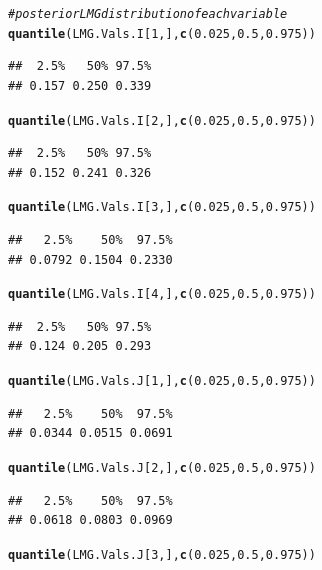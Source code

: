 \documentclass[11pt,a4paper,twoside]{book}
\makeatletter
\newcommand{\hlnum}[1]{\textcolor[rgb]{0.686,0.059,0.569}{#1}}%
\newcommand{\hlcom}[1]{\textcolor[rgb]{0.678,0.584,0.686}{\textit{#1}}}%
\newcommand{\hlstd}[1]{\textcolor[rgb]{0.345,0.345,0.345}{#1}}%
\newcommand{\hlkwd}[1]{\textcolor[rgb]{0.737,0.353,0.396}{\textbf{#1}}}%
\newenvironment{kframe}{%
 \def\at@end@of@kframe{}%
 \ifinner\ifhmode%
  \def\at@end@of@kframe{\end{minipage}}%
  \begin{minipage}{\columnwidth}%
 \fi\fi%
 \def\FrameCommand##1{\hskip\@totalleftmargin \hskip-\fboxsep
 \colorbox{shadecolor}{##1}\hskip-\fboxsep
     \hskip-\linewidth \hskip-\@totalleftmargin \hskip\columnwidth}%
 \MakeFramed {\advance\hsize-\width
   \@totalleftmargin\z@ \linewidth\hsize
   \@setminipage}}%
 {\par\unskip\endMakeFramed%
 \at@end@of@kframe}
\newenvironment{knitrout}{}{} %
\makeatother
\begin{document}
\begin{knitrout}
\begin{kframe}
\begin{alltt}
\hlcom{# posterior LMG distribution of each variable}
\hlkwd{quantile}\hlstd{(LMG.Vals.I[}\hlnum{1}\hlstd{,],} \hlkwd{c}\hlstd{(}\hlnum{0.025}\hlstd{,} \hlnum{0.5}\hlstd{,} \hlnum{0.975}\hlstd{))}
\end{alltt}
\begin{verbatim}
##  2.5%   50% 97.5% 
## 0.157 0.250 0.339
\end{verbatim}
\begin{alltt}
\hlkwd{quantile}\hlstd{(LMG.Vals.I[}\hlnum{2}\hlstd{,],} \hlkwd{c}\hlstd{(}\hlnum{0.025}\hlstd{,} \hlnum{0.5}\hlstd{,} \hlnum{0.975}\hlstd{))}
\end{alltt}
\begin{verbatim}
##  2.5%   50% 97.5% 
## 0.152 0.241 0.326
\end{verbatim}
\begin{alltt}
\hlkwd{quantile}\hlstd{(LMG.Vals.I[}\hlnum{3}\hlstd{,],} \hlkwd{c}\hlstd{(}\hlnum{0.025}\hlstd{,} \hlnum{0.5}\hlstd{,} \hlnum{0.975}\hlstd{))}
\end{alltt}
\begin{verbatim}
##   2.5%    50%  97.5% 
## 0.0792 0.1504 0.2330
\end{verbatim}
\begin{alltt}
\hlkwd{quantile}\hlstd{(LMG.Vals.I[}\hlnum{4}\hlstd{,],} \hlkwd{c}\hlstd{(}\hlnum{0.025}\hlstd{,} \hlnum{0.5}\hlstd{,} \hlnum{0.975}\hlstd{))}
\end{alltt}
\begin{verbatim}
##  2.5%   50% 97.5% 
## 0.124 0.205 0.293
\end{verbatim}
\begin{alltt}
\hlkwd{quantile}\hlstd{(LMG.Vals.J[}\hlnum{1}\hlstd{,],} \hlkwd{c}\hlstd{(}\hlnum{0.025}\hlstd{,} \hlnum{0.5}\hlstd{,} \hlnum{0.975}\hlstd{))}
\end{alltt}
\begin{verbatim}
##   2.5%    50%  97.5% 
## 0.0344 0.0515 0.0691
\end{verbatim}
\begin{alltt}
\hlkwd{quantile}\hlstd{(LMG.Vals.J[}\hlnum{2}\hlstd{,],} \hlkwd{c}\hlstd{(}\hlnum{0.025}\hlstd{,} \hlnum{0.5}\hlstd{,} \hlnum{0.975}\hlstd{))}
\end{alltt}
\begin{verbatim}
##   2.5%    50%  97.5% 
## 0.0618 0.0803 0.0969
\end{verbatim}
\begin{alltt}
\hlkwd{quantile}\hlstd{(LMG.Vals.J[}\hlnum{3}\hlstd{,],} \hlkwd{c}\hlstd{(}\hlnum{0.025}\hlstd{,} \hlnum{0.5}\hlstd{,} \hlnum{0.975}\hlstd{))}

\end{alltt}
\end{kframe}
\end{knitrout}
\end{document}
